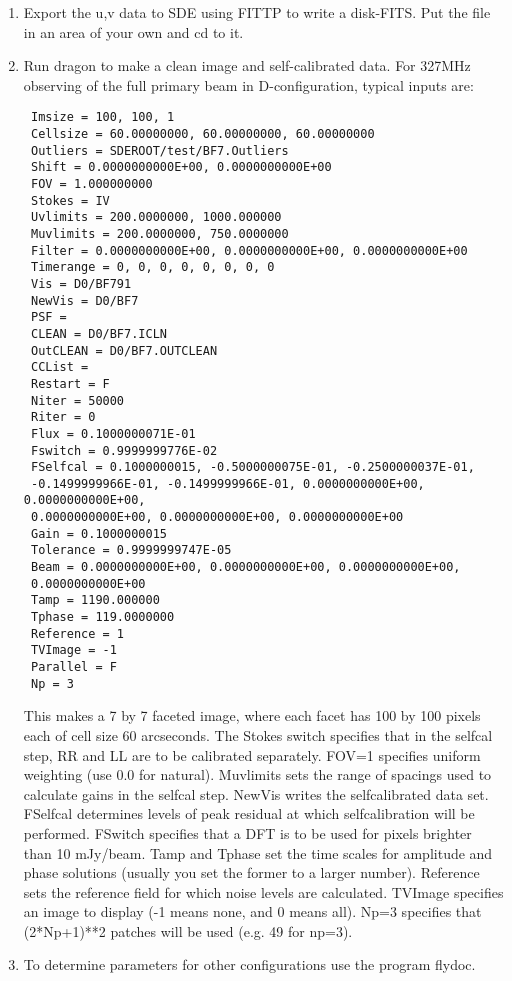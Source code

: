 \begin{enumerate}

\item Export the u,v data to SDE using FITTP to write a disk-FITS.
Put the file in an area of your own and cd to it. 

\item Run dragon to make a clean image and self-calibrated 
data. For 327MHz observing of the full primary beam in
D-configuration, typical inputs are:

\begin{verbatim}
 Imsize = 100, 100, 1
 Cellsize = 60.00000000, 60.00000000, 60.00000000
 Outliers = SDEROOT/test/BF7.Outliers
 Shift = 0.0000000000E+00, 0.0000000000E+00
 FOV = 1.000000000
 Stokes = IV
 Uvlimits = 200.0000000, 1000.000000
 Muvlimits = 200.0000000, 750.0000000
 Filter = 0.0000000000E+00, 0.0000000000E+00, 0.0000000000E+00
 Timerange = 0, 0, 0, 0, 0, 0, 0, 0
 Vis = D0/BF791
 NewVis = D0/BF7
 PSF =
 CLEAN = D0/BF7.ICLN
 OutCLEAN = D0/BF7.OUTCLEAN
 CCList =
 Restart = F
 Niter = 50000
 Riter = 0
 Flux = 0.1000000071E-01
 Fswitch = 0.9999999776E-02
 FSelfcal = 0.1000000015, -0.5000000075E-01, -0.2500000037E-01,
 -0.1499999966E-01, -0.1499999966E-01, 0.0000000000E+00, 0.0000000000E+00,
 0.0000000000E+00, 0.0000000000E+00, 0.0000000000E+00
 Gain = 0.1000000015
 Tolerance = 0.9999999747E-05
 Beam = 0.0000000000E+00, 0.0000000000E+00, 0.0000000000E+00,
 0.0000000000E+00
 Tamp = 1190.000000
 Tphase = 119.0000000
 Reference = 1
 TVImage = -1
 Parallel = F
 Np = 3
\end{verbatim}

This makes a 7 by 7 faceted image, where each facet has 100 by 100
pixels each of cell size 60 arcseconds. The Stokes switch specifies
that in the selfcal step, RR and LL are to be calibrated separately.
FOV=1 specifies uniform weighting (use 0.0 for natural). Muvlimits
sets the range of spacings used to calculate gains in the selfcal
step. NewVis writes the selfcalibrated data set.  FSelfcal
determines levels of peak residual at which selfcalibration will be
performed. FSwitch specifies that a DFT is to be used for pixels
brighter than 10 mJy/beam. Tamp and Tphase set the time scales for
amplitude and phase solutions (usually you set the former to a larger
number). Reference sets the reference field for which noise levels are
calculated. TVImage specifies an image to display (-1 means none, and
0 means all). Np=3 specifies that (2*Np+1)**2 patches will be used
(e.g. 49 for np=3).

\item To determine parameters for other configurations use the
program flydoc.

\end{enumerate}



